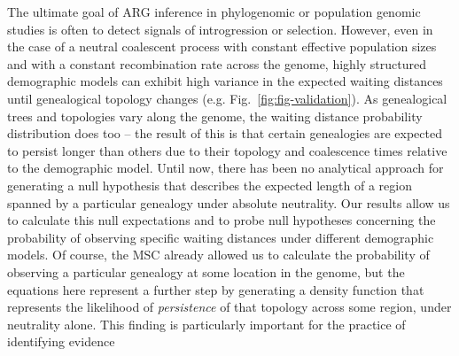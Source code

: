 \documentclass[11pt]{article}
\begin{document}
The ultimate goal of ARG inference in phylogenomic or population genomic studies
is often to detect signals of introgression or selection. 
However, even in the case of a neutral coalescent process 
with constant effective population sizes and with a constant recombination rate 
across the genome, highly structured demographic models can exhibit
high variance in the expected waiting distances until genealogical 
topology changes (e.g. Fig.~\ref{fig:fig-validation}). As genealogical trees and 
topologies vary along the genome, the waiting distance probability distribution 
does too -- the result of this is that certain genealogies are expected to persist longer than others 
due to their topology and coalescence times relative to the demographic model. 
Until now, there has been no analytical approach for generating a null hypothesis 
that describes the expected length of a region spanned by a particular genealogy under absolute neutrality.
Our results allow us to calculate this null expectations and to probe null hypotheses concerning the probability 
of observing specific waiting distances under different demographic models. 
Of course, the MSC already allowed us to calculate the probability of observing a particular 
genealogy at some location in the genome, but the equations here represent a further step by 
generating a density function that represents the likelihood of \emph{persistence} 
of that topology across some region, under neutrality alone. 
This finding is particularly important for the practice of identifying evidence 
\end{document}
